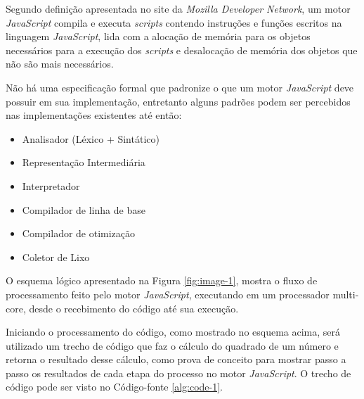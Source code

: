 Segundo definição apresentada no site da \textit{Mozilla Developer Network}, um motor
\textit{JavaScript} compila e executa \textit{scripts} contendo instruções e funções
escritos na linguagem \textit{JavaScript}, lida com a alocação de memória para os objetos
necessários para a execução dos \textit{scripts} e desalocação de memória dos objetos que
não são mais necessários. \cite{mdnjsapi}

Não há uma especificação formal que padronize o que um motor \textit{JavaScript} deve
possuir em sua implementação, entretanto alguns padrões podem ser percebidos nas
implementações existentes até então:

\begin{itemize}
    \item Analisador (Léxico + Sintático)
    \item Representação Intermediária
    \item Interpretador
    \item Compilador de linha de base
    \item Compilador de otimização
    \item Coletor de Lixo
\end{itemize}

O esquema lógico apresentado na Figura \ref{fig:image-1}, mostra o fluxo de processamento
feito pelo motor \textit{JavaScript}, executando em um processador multi-core, desde o
recebimento do código até sua execução.

\begin{figure}[h!]
    \centering
\end{figure}

Iniciando o processamento do código, como mostrado no esquema acima, será utilizado um
trecho de código que faz o cálculo do quadrado de um número e retorna o resultado desse
cálculo, como prova de conceito para mostrar passo a passo os resultados de cada etapa do
processo no motor \textit{JavaScript}. O trecho de código pode ser visto no Código-fonte
\ref{alg:code-1}.

